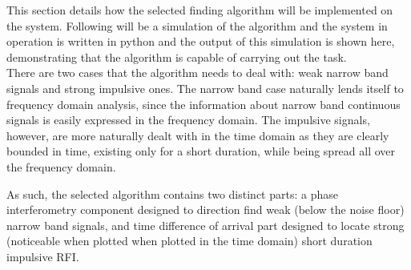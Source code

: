 This section details how the selected finding algorithm will be implemented on the system. Following will be a simulation of the algorithm and the system in operation is written in python and the output of this simulation is shown here, demonstrating that the algorithm is capable of carrying out the task.\\

There are two cases that the algorithm needs to deal with: weak narrow band signals and strong impulsive ones. The narrow band case naturally lends itself to frequency domain analysis, since the information about narrow band continuous signals is easily expressed in the frequency domain. The impulsive signals, however, are more naturally dealt with in the time domain as they are clearly bounded in time, existing only for a short duration, while being spread all over the frequency domain. 

As such, the selected algorithm contains two distinct parts: a phase interferometry component designed to direction find weak (below the noise floor) narrow band signals, and time difference of arrival part designed to locate strong (noticeable when plotted when plotted in the time domain) short duration impulsive RFI.

